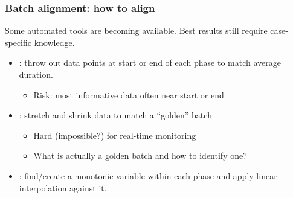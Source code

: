 \begin{frame}\frametitle{Batch alignment: how to align}

Some automated tools are becoming available.  Best results still require case-specific knowledge.
\begin{itemize}
	
	\item	{}: throw out data points at start or end of each phase to match average duration.
	
			\begin{itemize}
				\item	\alert{Risk}:  most informative data often near start or end
			\end{itemize}
			
			\pause
	
	\item	{}: stretch and shrink data to match a ``golden'' batch
	
			\begin{itemize}
				\item	Hard (impossible?) for real-time monitoring
				
				\item	What is actually a golden batch and how to identify one?
			\end{itemize}
			
			\pause
	
	\item	{}: find/create a monotonic variable within each phase and apply linear interpolation against it.
		
\end{itemize}

\end{frame}

